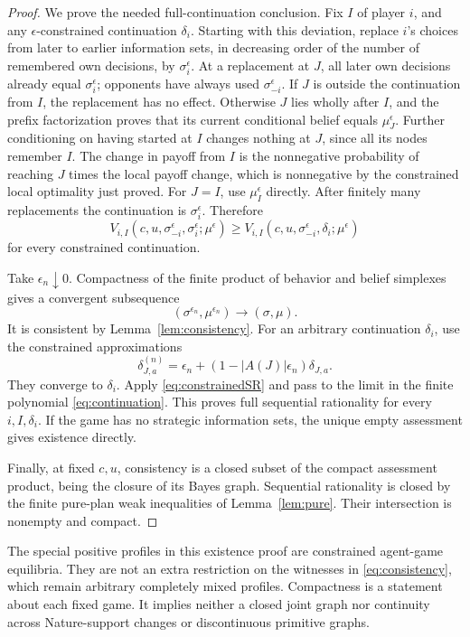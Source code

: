 \documentclass[11pt,a4paper]{article}
\numberwithin{equation}{section}
\theoremstyle{definition}
\begin{document}
\begin{proof}
We prove the needed full-continuation conclusion.
Fix \(I\) of player \(i\), and any \(\epsilon\)-constrained continuation
\(\delta_i\). Starting with this deviation, replace \(i\)'s choices
from later to earlier information sets, in decreasing order of the
number of remembered own decisions, by \(\sigma_i^\epsilon\).
At a replacement at \(J\), all later own decisions already equal
\(\sigma_i^\epsilon\); opponents have always used
\(\sigma_{-i}^\epsilon\).
If \(J\) is outside the continuation from \(I\), the replacement has
no effect. Otherwise \(J\) lies wholly after \(I\), and the prefix
factorization proves that its current conditional belief equals
\(\mu_J^\epsilon\).
Further conditioning on having started at \(I\) changes nothing at
\(J\), since all its nodes remember \(I\).
The change in payoff from \(I\) is the nonnegative probability of
reaching \(J\) times the local payoff change, which is nonnegative
by the constrained local optimality just proved.
For \(J=I\), use \(\mu_I^\epsilon\) directly.
After finitely many replacements the continuation is
\(\sigma_i^\epsilon\). Therefore
\begin{equation}\label{eq:constrainedSR}
 V_{i,I}(c,u,\sigma_{-i}^\epsilon,\sigma_i^\epsilon;\mu^\epsilon)
 \ge
 V_{i,I}(c,u,\sigma_{-i}^\epsilon,\delta_i;\mu^\epsilon)
\end{equation}
for every constrained continuation.

Take \(\epsilon_n\downarrow0\). Compactness of the finite product of
behavior and belief simplexes gives a convergent subsequence
\[
 (\sigma^{\epsilon_n},\mu^{\epsilon_n})\longrightarrow(\sigma,\mu).
\]
It is consistent by Lemma~\ref{lem:consistency}.
For an arbitrary continuation \(\delta_i\), use the constrained
approximations
\[
 \delta_{J,a}^{(n)}
 =\epsilon_n+(1-|A(J)|\epsilon_n)\delta_{J,a}.
\]
They converge to \(\delta_i\).
Apply \eqref{eq:constrainedSR} and pass to the limit in the finite
polynomial \eqref{eq:continuation}.
This proves full sequential rationality for every \(i,I,\delta_i\).
If the game has no strategic information sets, the unique empty
assessment gives existence directly.

Finally, at fixed \(c,u\), consistency is a closed subset of the
compact assessment product, being the closure of its Bayes graph.
Sequential rationality is closed by the finite pure-plan weak
inequalities of Lemma~\ref{lem:pure}.
Their intersection is nonempty and compact.
\end{proof}
The special positive profiles in this existence proof are constrained
agent-game equilibria. They are not an extra restriction on the
witnesses in \eqref{eq:consistency}, which remain arbitrary completely
mixed profiles.
Compactness is a statement about each fixed game.
It implies neither a closed joint graph nor continuity across
Nature-support changes or discontinuous primitive graphs.
\end{document}
